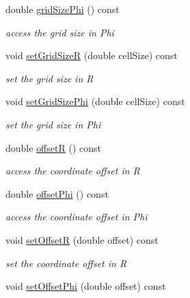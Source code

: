 \begin{DoxyCompactItemize}
double \hyperlink{class_d_d4hep_1_1_geometry_1_1_polar_grid_r_phi_a3a83a24366bd66a0ef63d05fd18959fe}{gridSizePhi} () const 
\begin{DoxyCompactList}\small\item\em access the grid size in Phi \item\end{DoxyCompactList}\item 
void \hyperlink{class_d_d4hep_1_1_geometry_1_1_polar_grid_r_phi_ae5229388a420afe11aab34f26118de28}{setGridSizeR} (double cellSize) const 
\begin{DoxyCompactList}\small\item\em set the grid size in R \item\end{DoxyCompactList}\item 
void \hyperlink{class_d_d4hep_1_1_geometry_1_1_polar_grid_r_phi_af6528b084c7fb0eeccc69eea5f9cc510}{setGridSizePhi} (double cellSize) const 
\begin{DoxyCompactList}\small\item\em set the grid size in Phi \item\end{DoxyCompactList}\item 
double \hyperlink{class_d_d4hep_1_1_geometry_1_1_polar_grid_r_phi_ad270ea1aca20ec0f8a62705f97077af0}{offsetR} () const 
\begin{DoxyCompactList}\small\item\em access the coordinate offset in R \item\end{DoxyCompactList}\item 
double \hyperlink{class_d_d4hep_1_1_geometry_1_1_polar_grid_r_phi_a5f89a64638e40b172652f20cf2a0c958}{offsetPhi} () const 
\begin{DoxyCompactList}\small\item\em access the coordinate offset in Phi \item\end{DoxyCompactList}\item 
void \hyperlink{class_d_d4hep_1_1_geometry_1_1_polar_grid_r_phi_ae9a0cd01fdf994e6e756e3746ae8db59}{setOffsetR} (double offset) const 
\begin{DoxyCompactList}\small\item\em set the coordinate offset in R \item\end{DoxyCompactList}\item 
void \hyperlink{class_d_d4hep_1_1_geometry_1_1_polar_grid_r_phi_ae53bea53de48d402529d5169439c0183}{setOffsetPhi} (double offset) const 

\end{DoxyCompactItemize}
